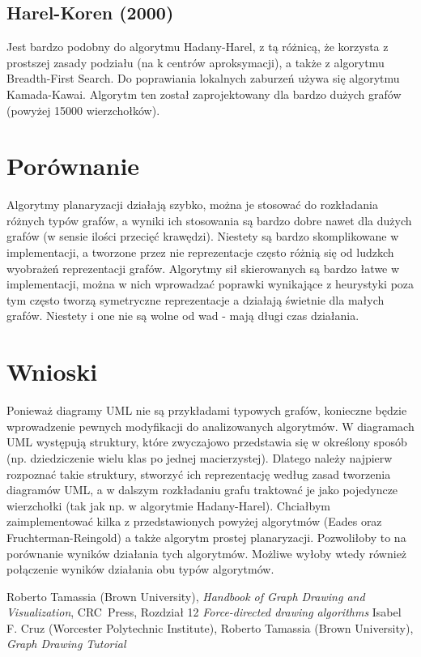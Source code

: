 \documentclass[a4paper,11pt]{article}
\begin{document}
\subsection{Harel-Koren (2000)}
Jest bardzo podobny do algorytmu Hadany-Harel, z tą różnicą, że korzysta z prostszej zasady podziału (na k centrów aproksymacji), a także z algorytmu Breadth-First Search. Do poprawiania lokalnych zaburzeń używa się algorytmu Kamada-Kawai. Algorytm ten został zaprojektowany dla bardzo dużych grafów (powyżej 15000 wierzchołków).

\section{Porównanie}
Algorytmy planaryzacji działają szybko, można je stosować do rozkładania różnych typów grafów, a wyniki ich stosowania są bardzo dobre nawet dla dużych grafów (w sensie ilości przecięć krawędzi). Niestety są bardzo skomplikowane w implementacji, a tworzone przez nie reprezentacje często różnią się od ludzkch wyobrażeń reprezentacji grafów.
Algorytmy sił skierowanych są bardzo łatwe w implementacji, można w nich wprowadzać poprawki wynikające z heurystyki poza tym często tworzą symetryczne reprezentacje a działają świetnie dla małych grafów. Niestety i one nie są wolne od wad - mają długi czas działania.

\section{Wnioski}
Ponieważ diagramy UML nie są przykładami typowych grafów, konieczne będzie wprowadzenie pewnych modyfikacji do analizowanych algorytmów. W diagramach UML występują struktury, które zwyczajowo przedstawia się w określony sposób (np. dziedziczenie wielu klas po jednej macierzystej). Dlatego należy najpierw rozpoznać takie struktury, stworzyć ich reprezentację według zasad tworzenia diagramów UML, a w dalszym rozkładaniu grafu traktować je jako pojedyncze wierzchołki (tak jak np. w algorytmie Hadany-Harel). Chciałbym zaimplementować kilka z przedstawionych powyżej algorytmów (Eades oraz Fruchterman-Reingold) a także algorytm prostej planaryzacji. Pozwoliłoby to na porównanie wyników działania tych algorytmów. Możliwe wyłoby wtedy również połączenie wyników działania obu typów algorytmów. 

\begin{thebibliography}{9}
    Roberto Tamassia (Brown University),
    \emph{Handbook of Graph Drawing and Visualization},
    CRC~Press, Rozdział 12 \emph{Force-directed drawing algorithms}
    Isabel F. Cruz (Worcester Polytechnic Institute),
    Roberto Tamassia (Brown University),
    \emph{Graph Drawing Tutorial}
\end{thebibliography}
\end{document}
